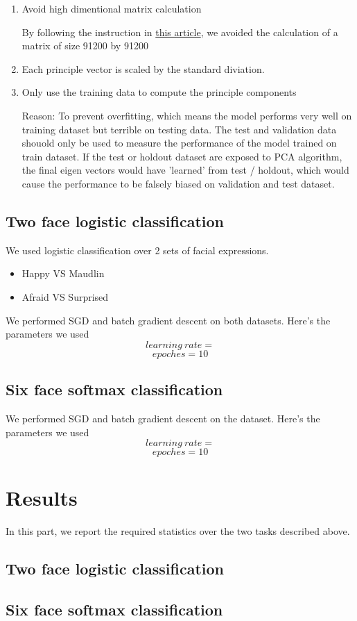 \documentclass{article} %
\begin{document}
\begin{enumerate}[1]
    \item Avoid high dimentional matrix calculation
    
    By following the instruction in \href{https://stackoverflow.com/questions/13224362/principal-component-analysis-pca-in-python}{this article}, we avoided the calculation of a matrix of size 91200 by 91200 
    
    \item Each principle vector is scaled by the standard diviation.
    \item Only use the training data to compute the principle components
    
    Reason: To prevent overfitting, which means the model performs very well on training dataset but terrible on testing data. The test and validation data shouold only be used to measure the performance of the model trained on train dataset. 
    If the test or holdout dataset are exposed to PCA algorithm, the final eigen vectors would have 'learned' from test / holdout, which would cause the performance 
    to be falsely biased on validation and test dataset.
\end{enumerate}

\subsection{Two face logistic classification}
We used logistic classification over 2 sets of facial expressions.

\begin{itemize}
    \item Happy VS Maudlin
    \item Afraid VS Surprised
\end{itemize}

We performed SGD and batch gradient descent on both datasets. Here's the parameters we used
$$learning\ rate = $$
$$epoches = 10$$

\subsection{Six face softmax classification}

We performed SGD and batch gradient descent on the dataset. Here's the parameters we used
$$learning\ rate = $$
$$epoches = 10$$

\section{Results}
In this part, we report the required statistics over the two tasks described above.

\subsection{Two face logistic classification}

\subsection{Six face softmax classification}
\end{document}
